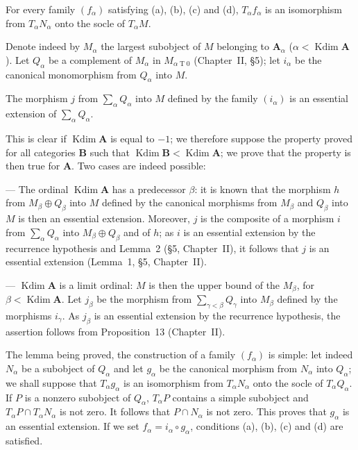 For every family $(f_\alpha)$ satisfying (a), (b), (c) and (d),
$T_\alpha f_\alpha$ is an isomorphism from $T_\alpha N_\alpha$ onto
the socle of $T_\alpha M$.

Denote indeed by $M_\alpha$ the largest subobject of $M$ belonging to
$\mathbf{A}_\alpha$
($\alpha < \operatorname{Kdim} \mathbf{A}$). Let $Q_\alpha$ be a
complement of $M_\alpha$ in $M_{\alpha \mathbin{T} 0}$
(Chapter~II, \S5); let $i_\alpha$ be the canonical monomorphism from
$Q_\alpha$ into $M$.

\begin{lemma}
The morphism $j$ from $\sum_\alpha Q_\alpha$ into $M$ defined by the
family $(i_\alpha)$ is an essential extension of
$\sum_\alpha Q_\alpha$.
\end{lemma}

This is clear if $\operatorname{Kdim} \mathbf{A}$ is equal to $-1$; we
therefore suppose the property proved for all categories
$\mathbf{B}$ such that
$\operatorname{Kdim} \mathbf{B} < \operatorname{Kdim} \mathbf{A}$; we
prove that the property is then true for $\mathbf{A}$. Two cases are
indeed possible:

--- The ordinal $\operatorname{Kdim} \mathbf{A}$ has a predecessor
$\beta$: it is known that the morphism $h$ from
$M_\beta \oplus Q_\beta$ into $M$ defined by the canonical morphisms
from $M_\beta$ and $Q_\beta$ into $M$ is then an essential extension.
Moreover, $j$ is the composite of a morphism $i$ from
$\sum_\alpha Q_\alpha$ into $M_\beta \oplus Q_\beta$ and of $h$; as $i$
is an essential extension by the recurrence hypothesis and Lemma~2
(\S5, Chapter~II), it follows that $j$ is an essential extension
(Lemma~1, \S5, Chapter~II).

--- $\operatorname{Kdim} \mathbf{A}$ is a limit ordinal: $M$ is then
the upper bound of the $M_\beta$, for
$\beta < \operatorname{Kdim} \mathbf{A}$. Let $j_\beta$ be the
morphism from $\sum_{\gamma < \beta} Q_\gamma$ into $M_\beta$ defined
by the morphisms $i_\gamma$. As $j_\beta$ is an essential extension by
the recurrence hypothesis, the assertion follows from Proposition~13
(Chapter~II).

The lemma being proved, the construction of a family $(f_\alpha)$ is
simple: let indeed $N_\alpha$ be a subobject of $Q_\alpha$ and let
$g_\alpha$ be the canonical morphism from $N_\alpha$ into $Q_\alpha$;
we shall suppose that $T_\alpha g_\alpha$ is an isomorphism from
$T_\alpha N_\alpha$ onto the socle of $T_\alpha Q_\alpha$. If $P$ is
a nonzero subobject of $Q_\alpha$, $T_\alpha P$ contains a simple
subobject and $T_\alpha P \cap T_\alpha N_\alpha$ is not zero. It
follows that $P \cap N_\alpha$ is not zero. This proves that $g_\alpha$
is an essential extension. If we set
$f_\alpha = i_\alpha \circ g_\alpha$, conditions (a), (b), (c) and (d)
are satisfied.

